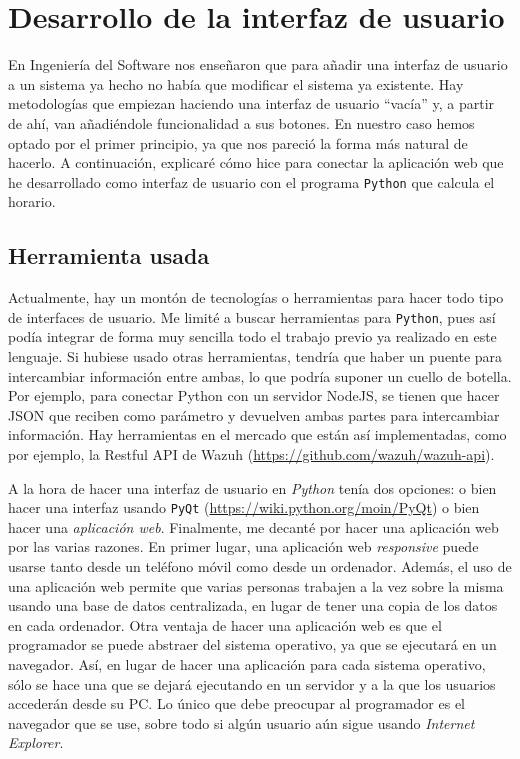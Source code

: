 \chapter{Desarrollo de la interfaz de usuario}
En Ingeniería del Software nos enseñaron que para añadir una interfaz de usuario a un sistema ya hecho no había que modificar el sistema ya existente. Hay metodologías que empiezan haciendo una interfaz de usuario ``vacía'' y, a partir de ahí, van añadiéndole funcionalidad a sus botones. En nuestro caso hemos optado por el primer principio, ya que nos pareció la forma más natural de hacerlo. A continuación, explicaré cómo hice para conectar la aplicación web que he desarrollado como interfaz de usuario con el programa \texttt{Python} que calcula el horario.

\section{Herramienta usada}
Actualmente, hay un montón de tecnologías o herramientas para hacer todo tipo de interfaces de usuario. Me limité a buscar herramientas para \texttt{Python}, pues así podía integrar de forma muy sencilla todo el trabajo previo ya realizado en este lenguaje. Si hubiese usado otras herramientas, tendría que haber un puente para intercambiar información entre ambas, lo que podría suponer un cuello de botella. Por ejemplo, para conectar Python con un servidor NodeJS, se tienen que hacer JSON que reciben como parámetro y devuelven ambas partes para intercambiar información. Hay herramientas en el mercado que están así implementadas, como por ejemplo, la Restful API de Wazuh (\url{https://github.com/wazuh/wazuh-api}). 

A la hora de hacer una interfaz de usuario en \textit{Python} tenía dos opciones: o bien hacer una interfaz usando \texttt{PyQt} (\url{https://wiki.python.org/moin/PyQt}) o bien hacer una \textit{aplicación web}. Finalmente, me decanté por hacer una aplicación web por las varias razones. En primer lugar, una aplicación web \textit{responsive} puede usarse tanto desde un teléfono móvil como desde un ordenador. Además, el uso de una aplicación web permite que varias personas trabajen a la vez sobre la misma usando una base de datos centralizada, en lugar de tener una copia de los datos en cada ordenador. Otra ventaja de hacer una aplicación web es que el programador se puede abstraer del sistema operativo, ya que se ejecutará en un navegador. Así, en lugar de hacer una aplicación para cada sistema operativo, sólo se hace una que se dejará ejecutando en un servidor y a la que los usuarios accederán desde su PC. Lo único que debe preocupar al programador es el navegador que se use, sobre todo si algún usuario aún sigue usando \textit{Internet Explorer}.

